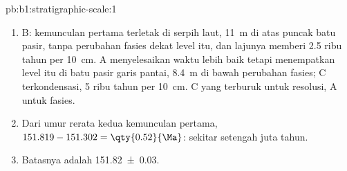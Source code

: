 \begin{solution}{pb:b1:stratigraphic-scale:1}
\begin{enumerate}
  \item B: kemunculan pertama terletak di serpih laut, \qty{11}{m} di atas puncak batu pasir,
        tanpa perubahan fasies dekat level itu, dan lajunya memberi \num{2.5} ribu tahun per
        \qty{10}{cm}. A menyelesaikan waktu lebih baik tetapi menempatkan level itu di batu pasir
        garis pantai, \qty{8.4}{m} di bawah perubahan fasies; C terkondensasi, \num{5} ribu tahun
        per \qty{10}{cm}. C yang terburuk untuk resolusi, A untuk fasies.
  \item Dari umur rerata kedua kemunculan pertama, $151.819 - 151.302 =
        \qty{0.52}{\Ma}$: sekitar setengah juta tahun.
  \item Batasnya adalah \qty[uncertainty-mode=separate]{151.82(3)}{\Ma}.
\end{enumerate}
\end{solution}
